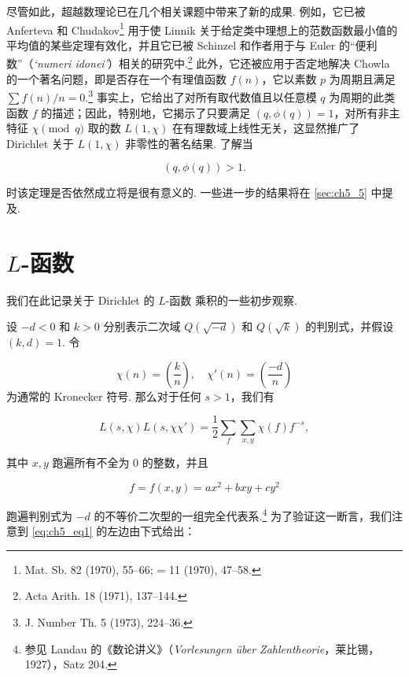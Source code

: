 尽管如此，超越数理论已在几个相关课题中带来了新的成果. 例如，它已被 Anferteva 和 Chudakov\footnote{Mat. Sb. 82 (1970), 55--66; = 11 (1970), 47--58.} 用于使 Linnik 关于给定类中理想上的范数函数最小值的平均值的某些定理有效化，并且它已被 Schinzel 和作者用于与 Euler 的“便利数”（\textit{\lq numeri idonei\rq}）相关的研究中.\footnote{Acta Arith. 18 (1971), 137--144.} 此外，它还被应用于否定地解决 Chowla 的一个著名问题，即是否存在一个有理值函数 $f(n)$，它以素数 $p$ 为周期且满足 $\sum f(n)/n = 0$.\footnote{J. Number Th. 5 (1973), 224--36.} 事实上，它给出了对所有取代数值且以任意模 $q$ 为周期的此类函数 $f$ 的描述；因此，特别地，它揭示了只要满足 $(q, \phi(q)) = 1$，对所有非主特征 $\chi \pmod q$ 取的数 $L(1,\chi)$ 在有理数域上线性无关，这显然推广了 Dirichlet 关于 $L(1,\chi)$ 非零性的著名结果. 了解当

\[(q,\phi(q))>1.\]

时该定理是否依然成立将是很有意义的. 一些进一步的结果将在 \autoref{sec:ch5_5} 中提及.

\section{$L$-函数}\label{sec:ch5_2}

我们在此记录关于 Dirichlet 的 $L$-函数 乘积的一些初步观察.

设 $-d < 0$ 和 $k > 0$ 分别表示二次域 $Q(\sqrt{-d})$ 和 $Q(\sqrt{k})$ 的判别式，并假设 $(k,d) = 1$. 令

\[ \chi(n) = \left(\frac{k}{n}\right), \quad \chi'(n) = \left(\frac{-d}{n}\right) \]
为通常的 Kronecker 符号. 那么对于任何 $s > 1$，我们有

\begin{equation}\tag{1}\label{eq:ch5_eq1}
L(s,\chi)L(s,\chi\chi') = \frac{1}{2}\sum_{f}\sum_{x,y}\chi(f)f^{-s},
\end{equation}

其中 $x, y$ 跑遍所有不全为 0 的整数，并且

\[f = f(x, y) = ax^2 + bxy + cy^2\]

跑遍判别式为 $-d$ 的不等价二次型的一组完全代表系.\footnote{参见 Landau 的《数论讲义》（\textit{Vorlesungen über Zahlentheorie}，莱比锡，1927），Satz 204.} 为了验证这一断言，我们注意到 \eqref{eq:ch5_eq1} 的左边由下式给出：

